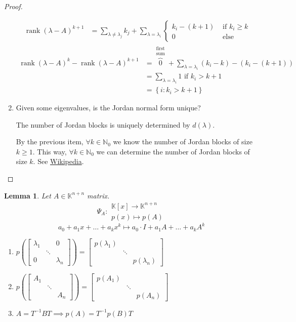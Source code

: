 \documentclass[a4paper]{article}
\newcounter{lecref}[section]
\numberwithin{lecref}{section}
\newtheorem{lemma}[lecref]{Lemma}
\newcommand{\set}[1]{\left\{#1\right\}}
\DeclareMathOperator{\rank}{rank}
\begin{document}
\begin{proof}
\begin{enumerate}
\begin{align*}
        \rank(\lambda - A)^{k+1} &= \sum_{\lambda \neq \lambda_j} k_j + \sum_{\lambda = \lambda_i} \begin{cases} k_i - (k+1) & \text{ if } k_i \geq k \\ 0 & \text{ else} \end{cases}
      \end{align*}
      \begin{align*}
        \rank(\lambda - A)^k - \rank(\lambda - A)^{k+1}
          &= \overbrace{0}^{\substack{\text{first} \\ \text{sum}}} + \sum_{\lambda = \lambda_i} (k_i - k) - (k_i - (k+1)) \\
          &= \sum_{\lambda = \lambda_i} 1 \text{ if } k_i > k+1 \\
          &= \set{i: k_i > k + 1}
      \end{align*}
    \item Given some eigenvalues, is the Jordan normal form unique?

        The number of Jordan blocks is uniquely determined by $d(\lambda)$.

        By the previous item, $\forall k \in \mathbb N_0$ we know the number of Jordan blocks of size $k \geq 1$.
        This way, $\forall k \in \mathbb N_0$ we can determine the number of Jordan blocks of size $k$.
        See \href{https://en.wikipedia.org/w/index.php?title=Jordan_normal_form&oldid=819574479#Uniqueness}{Wikipedia}.
  \end{enumerate}
\end{proof}

\begin{lemma} %
  Let $A \in \mathbb K^{n + n}$ matrix.
  \[ \Psi_A: \substack{\mathbb K[x] \to \mathbb K^{n + n} \\ p(x) \mapsto p(A)} \]
  \[ a_0 + a_1 x + \dots + a_k x^k \mapsto a_0 \cdot I + a_1 A + \dots + a_k A^k \]
  \begin{enumerate}
    \item $p\left(\begin{bmatrix} \lambda_1 & & 0 \\ & \ddots & \\ 0 & & \lambda_n \end{bmatrix}\right)
      = \begin{bmatrix} p(\lambda_1) & & \\ & \ddots & \\ & & p(\lambda_n) \end{bmatrix}$
    \item $p\left(\begin{bmatrix} A_1 & & \\ & \ddots & \\ & & A_n \end{bmatrix}\right) = \begin{bmatrix} p(A_1) & & \\ & \ddots & \\ & & p(A_n) \end{bmatrix}$
    \item $A = T^{-1} BT \implies p(A) = T^{-1} p(B) T$
  \end{enumerate}
\end{lemma}
\end{document}
